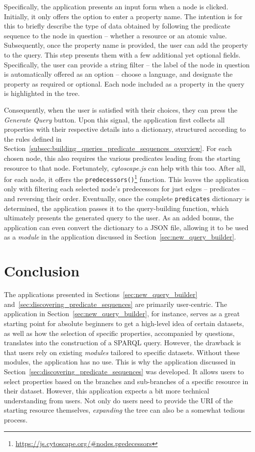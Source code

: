 Specifically, the application presents an input form when a node is clicked. Initially, it only offers the option to enter a property name. The intention is for this to briefly describe the type of data obtained by following the predicate sequence to the node in question – whether a resource or an atomic value. Subsequently, once the property name is provided, the user can add the property to the query. This step presents them with a few additional yet optional fields. Specifically, the user can provide a string filter – the label of the node in question is automatically offered as an option – choose a language, and designate the property as required or optional. Each node included as a property in the query is highlighted in the tree.

Consequently, when the user is satisfied with their choices, they can press the \textit{Generate Query} button. Upon this signal, the application first collects all properties with their respective details into a dictionary, structured according to the rules defined in Section~\ref{subsec:building_queries_predicate_sequences_overview}. For each chosen node, this also requires the various predicates leading from the starting resource to that node. Fortunately, \textit{cytoscape.js} can help with this too. After all, for each node, it offers the \texttt{predecessors()}\footnote{\url{https://js.cytoscape.org/\#nodes.predecessors}} function. This leaves the application only with filtering each selected node's predecessors for just edges – predicates – and reversing their order. Eventually, once the complete \texttt{predicates} dictionary is determined, the application passes it to the query-building function, which ultimately presents the generated query to the user. As an added bonus, the application can even convert the dictionary to a JSON file, allowing it to be used as a \textit{module} in the application discussed in Section~\ref{sec:new_query_builder}.

\section{Conclusion}

The applications presented in Sections~\ref{sec:new_query_builder} and~\ref{sec:discovering_predicate_sequences} are primarily user-centric. The application in Section~\ref{sec:new_query_builder}, for instance, serves as a great starting point for absolute beginners to get a high-level idea of certain datasets, as well as how the selection of specific properties, accompanied by questions, translates into the construction of a SPARQL query. However, the drawback is that users rely on existing \textit{modules} tailored to specific datasets. Without these modules, the application has no use. This is why the application discussed in Section~\ref{sec:discovering_predicate_sequences} was developed. It allows users to select properties based on the branches and sub-branches of a specific resource in their dataset. However, this application expects a bit more technical understanding from users. Not only do users need to provide the URI of the starting resource themselves, \textit{expanding} the tree can also be a somewhat tedious process.

